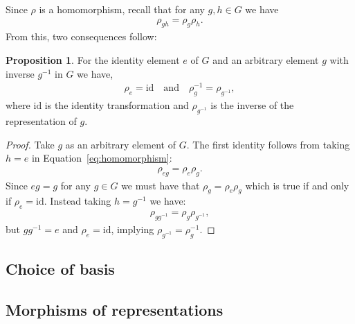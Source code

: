\documentclass[12pt, a4paper, twoside]{article}
\theoremstyle{definition}
\newtheorem{proposition}[definition]{Proposition}
\theoremstyle{remark}
\numberwithin{equation}{section}
\newcommand{\1}{\mathbf{1}}
\newcommand{\0}{\mathbf{0}}
\newcommand{\id}{\text{id}}
\begin{document}
	Since $\rho$ is a homomorphism, recall that for any $g,h \in G$ we have
	\begin{align}\label{eq:homomorphism}
		\rho_{gh} = \rho_g \rho_h.
	\end{align}
	From this, two consequences follow:
	\begin{proposition}
		For the identity element $e$ of $G$ and an arbitrary element $g$ with inverse $g^{-1}$ in $G$ we have,
		\begin{align*}
			\rho_e = \id \quad \text{and} \quad \rho_g^{-1} = \rho_{g^{-1}},
		\end{align*}
		where $\id$ is the identity transformation and $\rho_{g^{-1}}$ is the inverse of the representation of $g$.
	\end{proposition}
	\begin{proof}
		Take $g$ as an arbitrary element of $G$. The first identity follows from taking $h=e$ in Equation~\ref{eq:homomorphism}:
		\begin{align}
			\rho_{eg} = \rho_e \rho_g.
		\end{align}
		Since $eg=g$ for any $g\in G$ we must have that $\rho_g = \rho_e\rho_g$ which is true if and only if $\rho_e = \id$. Instead taking $h=g^{-1}$ we have:
		\begin{align}
			\rho_{gg^{-1}} = \rho_g \rho_{g^{-1}},
		\end{align}
		but $gg^{-1} = e$ and $\rho_e = \id$, implying $\rho_{g^{-1}} = \rho_g^{-1}$.
	\end{proof}
	
	\subsection{Choice of basis}
	
	\subsection{Morphisms of representations}
	
\end{document}
